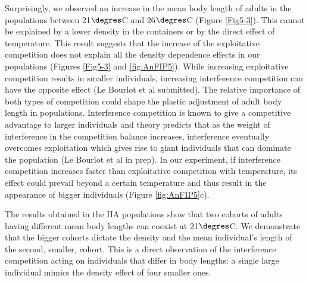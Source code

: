 Surprisingly, we observed an increase in the mean body length of adults in the
populations between 21$\degres$C and 26$\degres$C (Figure \ref{Fig5-3}). This
cannot be explained by a lower density in the containers or by the direct effect
of temperature. This result suggests that the increase of the exploitative
competition does not explain all the density dependence effects in our
populations (Figures \ref{Fig5-3} and \ref{fig:AnFIP5}). While increasing
exploitative competition results in smaller individuals, increasing interference
competition can have the opposite effect (Le Bourlot et al submitted). The
relative importance of both types of competition could shape the plastic
adjustment of adult body length in populations. Interference competition is
known to give a competitive advantage to larger individuals \autocites{mccormick2012a}
and theory predicts that as the weight of interference in the competition balance
increases, interference eventually overcomes exploitation which gives rise to
giant individuals that can dominate the population (Le Bourlot et al in prep).
In our experiment, if interference competition increases faster than
exploitative competition with temperature, its effect could prevail beyond a
certain temperature and thus result in the appearance of bigger individuals
(Figure \ref{fig:AnFIP5}c).

The results obtained in the HA populations show that two cohorts of adults
having different mean body lengths can coexist at 21$\degres$C. We demonstrate that the
bigger cohorts dictate the density and the mean individual’s length of the
second, smaller, cohort. This is a direct observation of the interference
competition acting on individuals that differ in body lengths: a single large
individual mimics the density effect of four smaller ones.


